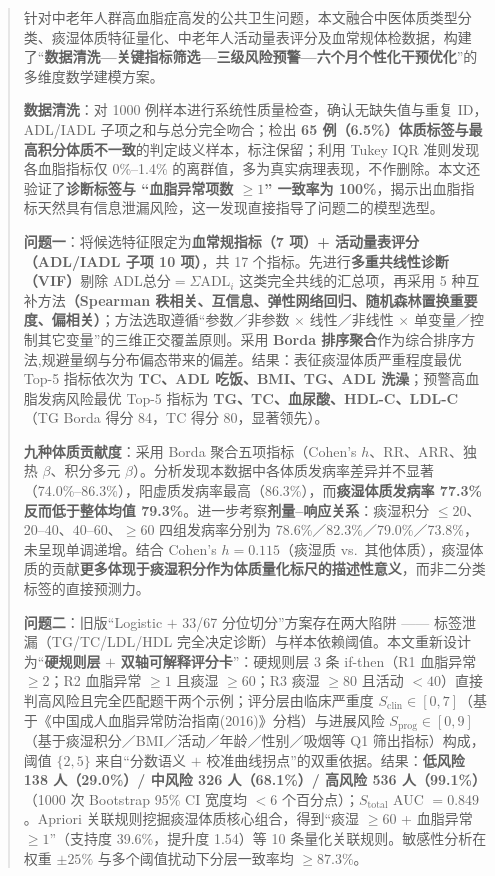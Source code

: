 \documentclass{MathorCupmodeling}
\begin{document}
\begin{abstract}
针对中老年人群高血脂症高发的公共卫生问题，本文融合中医体质类型分类、痰湿体质特征量化、中老年人活动量表评分及血常规体检数据，构建了``\textbf{数据清洗---关键指标筛选---三级风险预警---六个月个性化干预优化}''的多维度数学建模方案。

\textbf{数据清洗}：对 1000 例样本进行系统性质量检查，确认无缺失值与重复 ID，ADL/IADL 子项之和与总分完全吻合；检出 \textbf{65 例（6.5\%）体质标签与最高积分体质不一致}的判定歧义样本，标注保留；利用 Tukey IQR 准则发现各血脂指标仅 0\%--1.4\% 的离群值，多为真实病理表现，不作删除。本文还验证了\textbf{诊断标签与 ``血脂异常项数 $\ge 1$'' 一致率为 100\%}，揭示出血脂指标天然具有信息泄漏风险，这一发现直接指导了问题二的模型选型。

\textbf{问题一}：将候选特征限定为\textbf{血常规指标（7 项）+ 活动量表评分（ADL/IADL 子项 10 项）}，共 17 个指标。先进行\textbf{多重共线性诊断（VIF）}剔除 $\text{ADL总分}=\Sigma \text{ADL}_i$ 这类完全共线的汇总项，再采用 5 种互补方法\textbf{（Spearman 秩相关、互信息、弹性网络回归、随机森林置换重要度、偏相关）}；方法选取遵循``参数／非参数 $\times$ 线性／非线性 $\times$ 单变量／控制其它变量''的三维正交覆盖原则。采用 \textbf{Borda 排序聚合}作为综合排序方法,规避量纲与分布偏态带来的偏差。结果：表征痰湿体质严重程度最优 Top-5 指标依次为 \textbf{TC、ADL 吃饭、BMI、TG、ADL 洗澡}；预警高血脂发病风险最优 Top-5 指标为 \textbf{TG、TC、血尿酸、HDL-C、LDL-C}（TG Borda 得分 84，TC 得分 80，显著领先）。

\textbf{九种体质贡献度}：采用 Borda 聚合五项指标（Cohen's $h$、RR、ARR、独热 $\beta$、积分多元 $\beta$）。分析发现本数据中各体质发病率差异并不显著（74.0\%--86.3\%），阳虚质发病率最高（86.3\%），而\textbf{痰湿体质发病率 77.3\% 反而低于整体均值 79.3\%}。进一步考察\textbf{剂量--响应关系}：痰湿积分 $\le 20$、$20$--$40$、$40$--$60$、$\ge 60$ 四组发病率分别为 78.6\%／82.3\%／79.0\%／73.8\%，未呈现单调递增。结合 Cohen's $h = 0.115$（痰湿质 vs.~其他体质），痰湿体质的贡献\textbf{更多体现于痰湿积分作为体质量化标尺的描述性意义}，而非二分类标签的直接预测力。

\textbf{问题二}：旧版``Logistic $+$ 33/67 分位切分''方案存在两大陷阱 —— 标签泄漏（TG/TC/LDL/HDL 完全决定诊断）与样本依赖阈值。本文重新设计为``\textbf{硬规则层} $+$ \textbf{双轴可解释评分卡}''：硬规则层 3 条 if-then（R1 血脂异常 $\ge 2$；R2 血脂异常 $\ge 1$ 且痰湿 $\ge 60$；R3 痰湿 $\ge 80$ 且活动 $<40$）直接判高风险且完全匹配题干两个示例；评分层由临床严重度 $S_{\text{clin}}\in[0,7]$（基于《中国成人血脂异常防治指南(2016)》分档）与进展风险 $S_{\text{prog}}\in[0,9]$（基于痰湿积分／BMI／活动／年龄／性别／吸烟等 Q1 筛出指标）构成，阈值 $\{2, 5\}$ 来自``分数语义 $+$ 校准曲线拐点''的双重依据。结果：\textbf{低风险 138 人（29.0\%）/ 中风险 326 人（68.1\%）/ 高风险 536 人（99.1\%）}（1000 次 Bootstrap 95\% CI 宽度均 $<6$ 个百分点）；$S_{\text{total}}$ AUC $=0.849$。Apriori 关联规则挖掘痰湿体质核心组合，得到``痰湿 $\ge 60$ + 血脂异常 $\ge 1$''（支持度 39.6\%，提升度 1.54）等 10 条量化关联规则。敏感性分析在权重 $\pm 25\%$ 与多个阈值扰动下分层一致率均 $\ge 87.3\%$。


\end{abstract}
\end{document}
